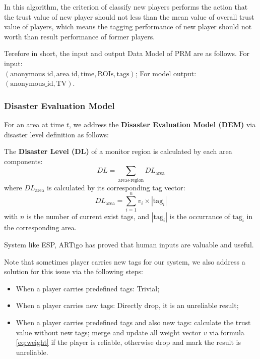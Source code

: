   In this algorithm, the criterion of classify new players performs the action that 
  the trust value of new player should not less than the mean value of overall trust value of players, 
  which means the tagging performance of new player should not worth than result performance of former players.
  
  Terefore in short, the input and output Data Model of PRM are as follows. For input:\\
  $(\text{anonymous\_id}, \text{area\_id}, \text{time}, \text{ROIs}, \text{tags})$; 
  For model output: 
  $(\text{anonymous\_id}, \text{TV})$.

  \subsubsection{Disaster Evaluation Model}

  For an area at time $t$, we address the \textbf{Disaster Evaluation Model (DEM)} 
  via disaster level definition as follows:

  \begin{definition}
  \label{def:dl}
  The \textbf{Disaster Level (DL)} of a monitor region is calculated by each area components:
  \[
    DL = \sum_{\text{area}\in\text{region}}{DL_{\text{area}}}
  \]
  where $DL_{\text{area}}$ is calculated by its corresponding tag vector:
  \[
    DL_{\text{area}} = \sum_{i=1}^{n}{v_i \times |\text{tag}_i|}
  \]
  with $n$ is the number of current exist tags, and $|\text{tag}_i|$ is the occurrance of $\text{tag}_i$
  in the corresponding area.
  \end{definition}

  System like ESP\cite{von2004labeling}, ARTigo\cite{wieser2013artigo} has proved that 
  human inputs are valuable and useful.

  Note that sometimes player carries new tags for our system, we also address a solution 
  for this issue via the following steps:

  \begin{itemize}
  \item When a player carries predefined tags: Trivial;
  \item When a player carries new tags: Directly drop, it is an unreliable result;
  \item When a player carries predefined tags and also new tags: calculate the trust value without new tags;
   merge and update all weight vector $v$ via formula \ref{eq:weight} if the player is reliable, 
   otherwise drop and mark the result is unreliable.
  \end{itemize}

